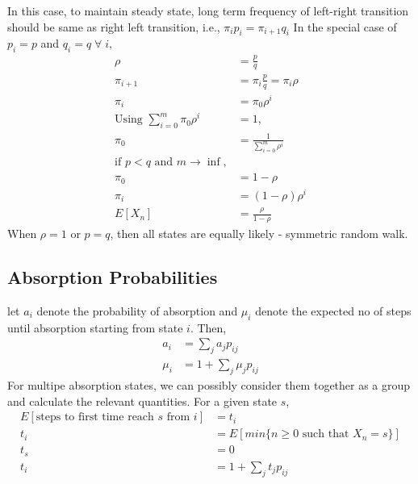 \documentclass[11pt, a4paper]{article}
\begin{document}
    In this case, to maintain steady state, long term frequency of left-right transition should be same as right left transition, i.e., $\pi_{i}p_{i} = \pi_{i+1}q_{i}$ \newline
    In the special case of $p_{i} = p$ and $q_{i} = q \;\forall\; i$,
    \begin{align*}
        \rho &= \frac{p}{q} \tag*{load factor}\\
        \pi_{i+1} &= \pi_{i} \frac{p}{q} = \pi_{i} \rho \\
        \pi_{i} &= \pi_{0} \rho^{i} \tag*{$i = 0,\ldots,m$} \\
        \text{Using } \sum_{i=0}^{m} \pi_{0}\rho^{i} &= 1,\\
        \pi_{0} &= \frac{1}{\sum_{i=0}^{m} \rho^{i}}\\
        \text{if $p < q$ and $m \rightarrow \inf,$}\\
        \pi_{0} &= 1 - \rho \\
        \pi_{i} &= (1-\rho)\rho^{i}\\
        E[X_{n}] &= \frac{\rho}{1-\rho} \tag*{Exponential Distribution}
    \end{align*}
    When $\rho = 1$ or $p = q$, then all states are equally likely - symmetric random walk.

    \subsection{Absorption Probabilities}
    \label{sec_markov_absorb}
    let $a_{i}$ denote the probability of absorption and $\mu_{i}$ denote the expected no of steps until absorption starting from state $i$. Then,
    \begin{align*}
        a_{i} &= \sum_{j} a_{j}p_{ij} \tag*{outflux to the possible states}\\
        \mu_{i} &= 1 + \sum_{j} \mu_{j} p_{ij}
    \end{align*}
    For multipe absorption states, we can possibly consider them together as a group and calculate the relevant quantities. \newline
    For a given state $s$,
    \begin{align*}
        E[\text{steps to first time reach $s$ from $i$}] &= t_{i} \\
        t_{i} &= E[min \{n \geq 0 \text{ such that } X_{n} = s\}] \\
        t_{s} &= 0 \\
        t_{i} &= 1 + \sum_{j} t_{j}p_{ij} \tag*{outflux to all possible states}
    \end{align*}
\end{document}

